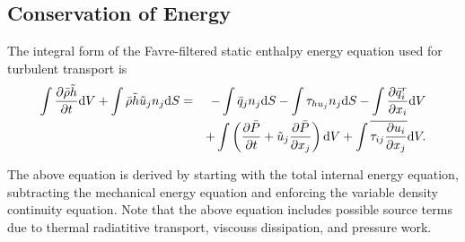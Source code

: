 \subsection{Conservation of Energy}

The integral form of the Favre-filtered static enthalpy energy equation used for
turbulent transport is
%
\begin{eqnarray}
   \int {{\partial \bar{\rho} \tilde{h}} \over {\partial t}} {\rm d}V
  + \int \bar{\rho} \tilde{h} \tilde{u}_j n_j {\rm d}S 
  &=& - \int \bar{q}_j n_j {\rm d}S
  - \int \tau_{h u_j} n_j {\rm d}S 
  - \int {{\partial \bar{q}_i^r} \over {\partial x_i}} {\rm d}V \nonumber \\
  && + \int \left({{\partial \bar{P}} \over {\partial t}} + \tilde{u}_j {{\partial \bar{P}} \over {\partial x_j}}\right){\rm d}V
  + \int \overline{\tau_{ij} {{\partial u_i} \over {\partial x_j }}} {\rm d}V.
\label{fav-enth}
\end{eqnarray}
%

The above equation is derived by starting with the total internal energy
equation, subtracting the mechanical energy equation and enforcing the
variable density continuity equation. Note that the above equation includes
possible source terms due to thermal radiatitive transport, viscouss dissipation,
and pressure work.

